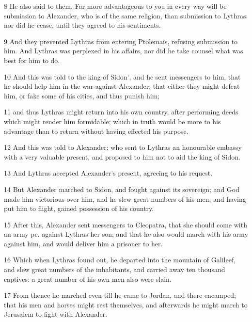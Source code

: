 \par 8 He also said to them, Far more advantageous to you in every way will be submission to Alexander, who is of the same religion, than submission to Lythras: nor did he cease, until they agreed to his sentiments. 

\par 9 And they prevented Lythras from entering Ptolemais, refusing submission to him. And Lythras was perplexed in his affairs, nor did he take counsel what was best for him to do. 

\par 10 And this was told to the king of Sidon’, and he sent messengers to him, that he should help him in the war against Alexander; that either they might defeat him, or fake some of his cities, and thus punish him; 

\par 11 and thus Lythras might return into his own country, after performing deeds which might render him formidable; which in truth would be more to his advantage than to return without having effected his purpose. 

\par 12 And this was told to Alexander; who sent to Lythras an honourable embassy with a very valuable present, and proposed to him not to aid the king of Sidon. 

\par 13 And Lythras accepted Alexander’s present, agreeing to his request. 

\par 14 But Alexander marched to Sidon, and fought against its sovereign; and God made him victorious over him, and he slew great numbers of his men; and having put him to flight, gained possession of his country. 

\par 15 After this, Alexander sent messengers to Cleopatra, that she should come with an army pc. against Lythras her son; and that he also would march with his army against him, and would deliver him a prisoner to her. 

\par 16 Which when Lythras found out, he departed into the mountain of Galileef, and slew great numbers of the inhabitants, and carried away ten thousand captives: a great number of his own men also were slain. 

\par 17 From thence he marched even till he came to Jordan, and there encamped; that his men and horses might rest themselves, and afterwards he might march to Jerusalem to fight with Alexander. 


